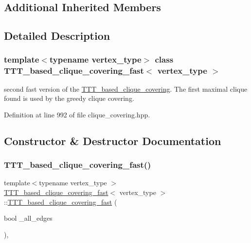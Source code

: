 \subsection*{Additional Inherited Members}


\subsection{Detailed Description}
\subsubsection*{template$<$typename vertex\+\_\+type$>$\newline
class T\+T\+T\+\_\+based\+\_\+clique\+\_\+covering\+\_\+fast$<$ vertex\+\_\+type $>$}

second fast version of the \hyperlink{classTTT__based__clique__covering}{T\+T\+T\+\_\+based\+\_\+clique\+\_\+covering}. The first maximal clique found is used by the greedy clique covering. 

Definition at line 992 of file clique\+\_\+covering.\+hpp.



\subsection{Constructor \& Destructor Documentation}
\mbox{\label{classTTT__based__clique__covering__fast_a73d9b9cb50e6556cd8b6719b23314c35}} 
\subsubsection{\texorpdfstring{T\+T\+T\+\_\+based\+\_\+clique\+\_\+covering\+\_\+fast()}{TTT\_based\_clique\_covering\_fast()}}
{\footnotesize\ttfamily template$<$typename vertex\+\_\+type $>$ \\
\hyperlink{classTTT__based__clique__covering__fast}{T\+T\+T\+\_\+based\+\_\+clique\+\_\+covering\+\_\+fast}$<$ vertex\+\_\+type $>$\+::\hyperlink{classTTT__based__clique__covering__fast}{T\+T\+T\+\_\+based\+\_\+clique\+\_\+covering\+\_\+fast} (\begin{DoxyParamCaption}\item[{bool}]{\+\_\+all\+\_\+edges }\end{DoxyParamCaption})\hspace{0.3cm}{\ttfamily [inline]}, {\ttfamily [explicit]}}



